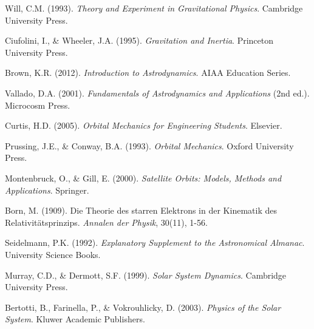 \documentclass[11pt,a4paper]{article}
\theoremstyle{remark}
\begin{document}
\begin{thebibliography}{99}
Will, C.M. (1993). \textit{Theory and Experiment in Gravitational Physics}. Cambridge University Press.

Ciufolini, I., \& Wheeler, J.A. (1995). \textit{Gravitation and Inertia}. Princeton University Press.

Brown, K.R. (2012). \textit{Introduction to Astrodynamics}. AIAA Education Series.

Vallado, D.A. (2001). \textit{Fundamentals of Astrodynamics and Applications} (2nd ed.). Microcosm Press.

Curtis, H.D. (2005). \textit{Orbital Mechanics for Engineering Students}. Elsevier.

Prussing, J.E., \& Conway, B.A. (1993). \textit{Orbital Mechanics}. Oxford University Press.

Montenbruck, O., \& Gill, E. (2000). \textit{Satellite Orbits: Models, Methods and Applications}. Springer.

Born, M. (1909). Die Theorie des starren Elektrons in der Kinematik des Relativitätsprinzips. \textit{Annalen der Physik}, 30(11), 1-56.

Seidelmann, P.K. (1992). \textit{Explanatory Supplement to the Astronomical Almanac}. University Science Books.

Murray, C.D., \& Dermott, S.F. (1999). \textit{Solar System Dynamics}. Cambridge University Press.

Bertotti, B., Farinella, P., \& Vokrouhlicky, D. (2003). \textit{Physics of the Solar System}. Kluwer Academic Publishers.

\end{thebibliography}
\end{document}
